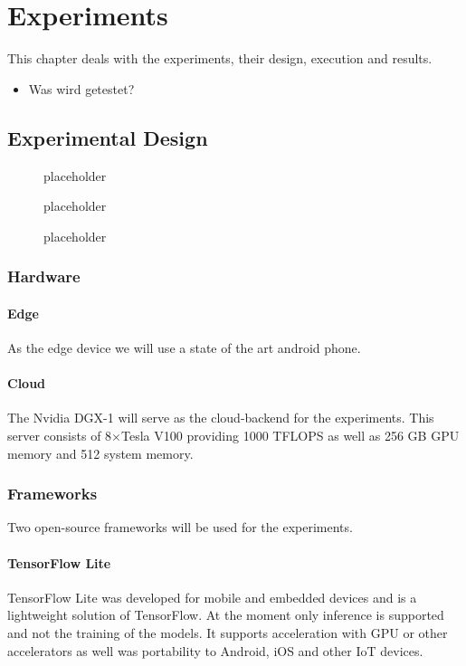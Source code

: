 \chapter{Experiments}
This chapter deals with the experiments, their design, execution and results.
\begin{itemize}
    \item Was wird getestet?
\end{itemize}
\section{Experimental Design}
\begin{figure}[H]
\centering

\caption{placeholder}
\label{fig:cloud}
\end{figure}
\begin{figure}[H]
\centering

\caption{placeholder}
\label{fig:cloud}
\end{figure}
\begin{figure}[H]
\centering

\caption{placeholder}
\label{fig:edge}
\end{figure}
\subsection{Hardware}
\subsubsection{Edge}
As the edge device we will use a state of the art android phone. 
\subsubsection{Cloud}
The Nvidia DGX-1 will serve as the cloud-backend for the experiments. This server consists of 8$\times$Tesla V100 providing 1000 TFLOPS as well as 256 GB GPU memory and 512 system memory.
\subsection{Frameworks}
Two open-source frameworks will be used for the experiments.
\subsubsection{TensorFlow Lite}
TensorFlow Lite was developed for mobile and embedded devices and is a lightweight solution of TensorFlow.
At the moment only inference is supported and not the training of the models.
It supports acceleration with GPU or other accelerators as well was portability to Android, iOS and other IoT devices.


